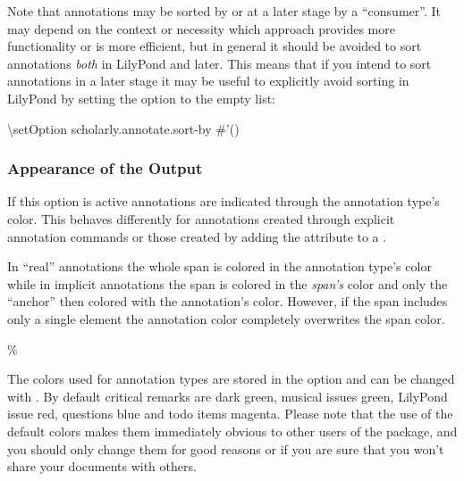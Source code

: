 \documentclass[]{ollmanual}
\newenvironment{Shaded}{}{}
\newcommand{\FloatTok}[1]{\textcolor[rgb]{0.25,0.63,0.44}{#1}}
\newcommand{\FunctionTok}[1]{\textcolor[rgb]{0.02,0.16,0.49}{#1}}
\newcommand{\NormalTok}[1]{#1}
\begin{document}
Note that annotations may be sorted by 
or at a later stage by a ``consumer''. It may depend on the context or
necessity which approach provides more functionality or is more
efficient, but in general it should be avoided to sort annotations
\emph{both} in LilyPond and later. This means that if you intend to sort
annotations in a later stage it may be useful to explicitly avoid
sorting in LilyPond by setting the option to the empty list:

\begin{Shaded}
\begin{Highlighting}[]
\FunctionTok{\textbackslash{}setOption}\NormalTok{ scholarly.annotate.sort-by #}\FloatTok{'()}
\end{Highlighting}
\end{Shaded}

\hypertarget{appearance-of-the-output}{%
\subsubsection{Appearance of the
Output}\label{appearance-of-the-output}}


If this option is active annotations are indicated through the
annotation type's color. This behaves differently for annotations
created through explicit annotation commands or those created by adding
the  attribute to a .

In ``real'' annotations the whole span is colored in the annotation
type's color while in implicit annotations the span is colored in the
\emph{span's} color and only the ``anchor'' then colored with the
annotation's color. However, if the span includes only a single element
the annotation color completely overwrites the span color.

\begin{Shaded}
\begin{Highlighting}[]

\end{Highlighting}
\end{Shaded}

\%


The colors used for annotation types are stored in the
 option and can be changed with
. By default critical remarks are
dark green, musical issues green, LilyPond issue red, questions blue and
todo items magenta. Please note that the use of the default colors makes
them immediately obvious to other users of the package, and you should
only change them for good reasons or if you are sure that you won't
share your documents with others.
\end{document}
